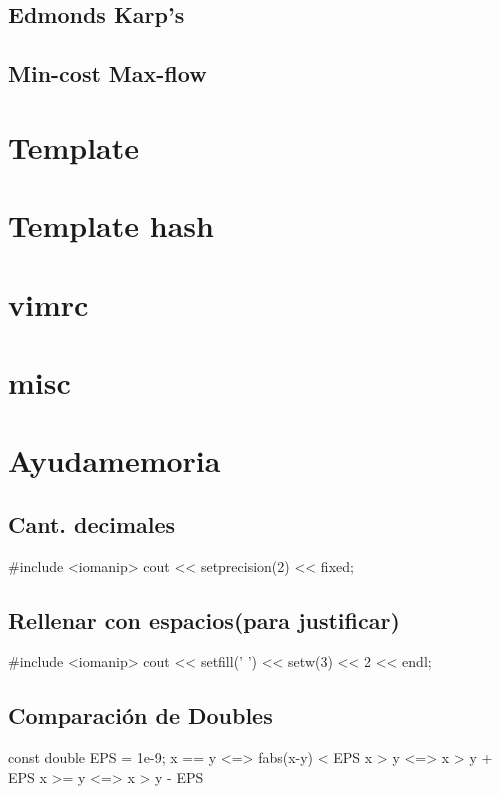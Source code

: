 \subsection{Edmonds Karp's}
\subsection{Min-cost Max-flow}


\section{Template}%

\section{Template hash}

\section{vimrc}

\section{misc}


\section{Ayudamemoria}%
\subsection*{Cant. decimales} 	
\begin{code}
#include <iomanip>
cout << setprecision(2) << fixed;
\end{code}
\subsection*{Rellenar con espacios(para justificar)}
\begin{code}
#include <iomanip>
cout << setfill(' ') << setw(3) << 2 << endl;
\end{code}
\subsection*{Comparación de Doubles}
\begin{code}
const double EPS = 1e-9;
x == y	<=> fabs(x-y) < EPS
x >  y	<=> x > y + EPS
x >= y	<=> x > y - EPS
\end{code}
